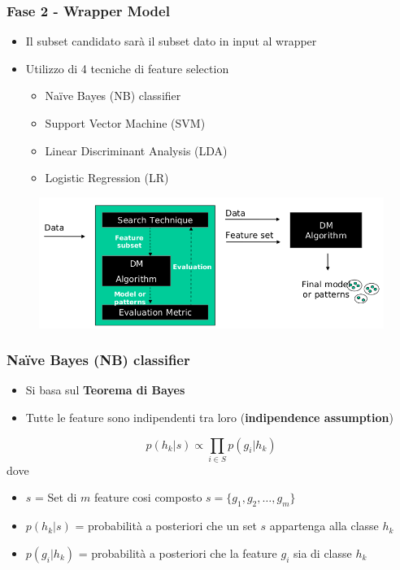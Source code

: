 \documentclass{beamer}
\begin{document}
\begin{frame}
	\frametitle{Fase 2 - Wrapper Model}
	\begin{itemize}
		\item Il subset candidato sarà il subset dato in input al wrapper
		\item Utilizzo di 4 tecniche di feature selection
			\begin{itemize}
				\item Na\"ive Bayes (NB) classifier
				\item Support Vector Machine (SVM)
				\item Linear Discriminant Analysis (LDA)
				\item Logistic Regression (LR)
			\end{itemize}
		\end{itemize}
\begin{figure}[htb]
	\includegraphics[width=.70\textwidth]{figure/wrapper.png}
\end{figure}
\end{frame}

\begin{frame}
	\frametitle{Na\"ive Bayes (NB) classifier}
	\begin{itemize}
		\item Si basa sul \textbf{Teorema di Bayes}
		\item Tutte le feature sono indipendenti tra loro (\textbf{indipendence assumption})
	\end{itemize}
	$$p(h_k|s) \propto \prod_{i \in S}{p(g_i|h_k)}$$ dove 
	\begin{itemize}
		\item $s$ = Set di $m$ feature cosi composto $s= \{ g_1,g_2,\dots,g_m \}$
		\item $p(h_k|s)$ = probabilità a posteriori che un set $s$ appartenga alla classe $h_k$
		\item $ p(g_i|h_k)$ = probabilità a posteriori che la feature $g_i$ sia di classe $h_k$
	\end{itemize}
\end{frame}
\end{document}
